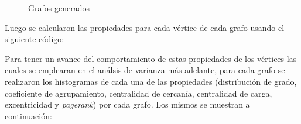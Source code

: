 \documentclass{article}
\begin{document}
\begin{figure}[htbp]
\caption{Grafos generados}
\label{Fig1} 
\end{figure}

Luego se calcularon las propiedades para cada vértice de cada grafo usando el siguiente código:

\newpage


Para tener un avance del comportamiento de estas propiedades de los vértices las cuales se emplearan en el análsis de varianza más adelante, para cada grafo se realizaron los histogramas de cada una de las propiedades (distribución de grado, coeficiente de agrupamiento, centralidad de cercanía, centralidad de carga, excentricidad y \textit{pagerank}) por cada grafo. Los mismos se muestran a continuación:
\end{document}
